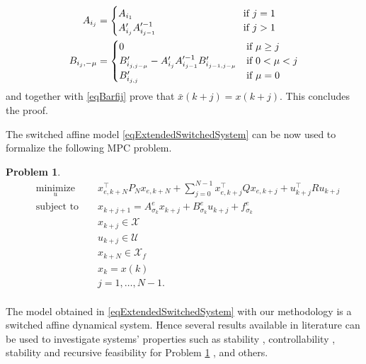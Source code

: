 \documentclass[]{ifacconf}  %
\newtheorem{problem}{Problem}
\begin{document}
\begin{pf}
	\small
	\begin{align}
	A_{i_j} &=\begin{cases}
	A_{i_1} \kern 3.561cm &\mbox{if } j = 1\\
	A'_{i_j}A'^{-1}_{i_{j-1}}												    &\mbox{if } j > 1				
	\end{cases}\\
	\bar B_{i_j,-\mu} &=\begin{cases}
	0																&\mbox{if } \mu \geq j\\
	B'_{i_{j,j-\mu}} - A'_{i_j}A'^{-1}_{i_{j-1}}B'_{i_{j-1,j-\mu}} 	&\mbox{if } 0< \mu < j\\
	B'_{i_{j,j}}												    &\mbox{if } \mu = 0				
	\end{cases}
	\end{align}
	\normalsize
	and together with \eqref{eqBarfij} prove that $\bar x(k+j) = x(k+j)$.
	This concludes the proof.
\end{pf}
The switched affine model \eqref{eqExtendedSwitchedSystem} can be now used to formalize the following MPC problem.
\begin{problem}\label{pbMPC-SA}
\small
\begin{equation*}
\begin{aligned}
& \underset{u}{\text{minimize}} & &  x_{e,k+N}^\top P_N x_{e,k+N} + \sum_{j=0}^{N-1} x_{e,k+j}^\top Q x_{e,k+j} + u^\top_{k+j} R u_{k+j}  \\
& \text{subject to }            & &  x_{k+j+1}  =   A^e_{\sigma_k} x_{k+j}+B^e_{\sigma_k} u_{k+j}+f^e_{\sigma_k}                          \\
&                               & &  x_{k+j}   \in \mathcal{X}                                                                            \\
&                               & &  u_{k+j}   \in \mathcal{U}  																          \\
&                               & &  x_{k+N}   \in \mathcal{X}_f																		  \\
&                               & &  x_{k}      =   x(k)             									                                  \\
&                               & &  j          =   1,\ldots,N-1.                                                                         \\
\end{aligned}
\end{equation*}
\normalsize
\end{problem}
The model obtained in \eqref{eqExtendedSwitchedSystem} with our methodology is a switched affine dynamical system. Hence several results available in literature can be used to investigate systems' properties such as stability \cite{HespanhaTAC2004,LiberzonAutomatica1999}, controllability \cite{WangTAC2002,LeeAutomatica2002}, stability and recursive feasibility for Problem \ref{pbMPC-SA} \cite{MullerJPC2012,BraatzAutomatica2016,DanielsonACC2016}, and others.
\end{document}
